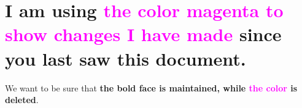 \documentclass[11pt]{article}
\newcommand{\revised}[1]{\textcolor{magenta}{#1}}
\begin{document}
\section*{I am using  \revised{the color magenta to show changes I have made} since you last saw this document.}

We want to be sure that \textbf{the bold face is maintained, while \revised{the color} is deleted}.
\end{document}
